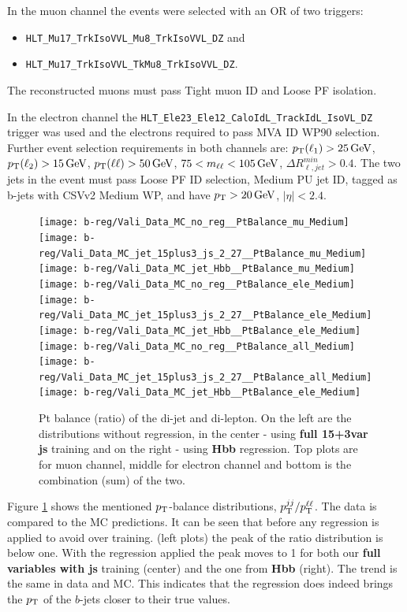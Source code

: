In the muon channel the events were selected with an OR of two triggers:
\begin{itemize}
\item \verb|HLT_Mu17_TrkIsoVVL_Mu8_TrkIsoVVL_DZ| and 
\item \verb|HLT_Mu17_TrkIsoVVL_TkMu8_TrkIsoVVL_DZ|. 
\end{itemize}
The reconstructed muons must pass Tight muon ID and Loose PF isolation. 

In the electron channel the \verb|HLT_Ele23_Ele12_CaloIdL_TrackIdL_IsoVL_DZ| trigger was used and
the electrons required to pass MVA ID WP90 selection.  
Further event selection requirements in both channels are: $p_{\mathrm{T}}(\ell_1) > 25\,\text{Ge\hspace{-.08em}V}$,
$p_{\mathrm{T}}(\ell_2) > 15\,\text{Ge\hspace{-.08em}V}$, $p_{\mathrm{T}}(\ell\ell) > 50\,\text{Ge\hspace{-.08em}V}$,
$75<m_{\ell\ell}<105\,\text{Ge\hspace{-.08em}V}$, $\Delta R^{min}_{\ell, jet} > 0.4$. The two
jets in the event must pass Loose PF ID selection, Medium PU jet ID,
tagged as b-jets with CSVv2 Medium WP, and have $p_{\mathrm{T}}>20\,\text{Ge\hspace{-.08em}V}$,
$|\eta|<2.4$.

\begin{figure}[thb]
  \centering
  \texttt{[image: b-reg/Vali\_Data\_MC\_no\_reg\_\_PtBalance\_mu\_Medium]}\hfil
  \texttt{[image: b-reg/Vali\_Data\_MC\_jet\_15plus3\_js\_2\_27\_\_PtBalance\_mu\_Medium]}\hfil
  \texttt{[image: b-reg/Vali\_Data\_MC\_jet\_Hbb\_\_PtBalance\_mu\_Medium]}\hfil\\
  \texttt{[image: b-reg/Vali\_Data\_MC\_no\_reg\_\_PtBalance\_ele\_Medium]}\hfil
  \texttt{[image: b-reg/Vali\_Data\_MC\_jet\_15plus3\_js\_2\_27\_\_PtBalance\_ele\_Medium]}\hfil
  \texttt{[image: b-reg/Vali\_Data\_MC\_jet\_Hbb\_\_PtBalance\_ele\_Medium]}\hfil\\
  \texttt{[image: b-reg/Vali\_Data\_MC\_no\_reg\_\_PtBalance\_all\_Medium]}\hfil
  \texttt{[image: b-reg/Vali\_Data\_MC\_jet\_15plus3\_js\_2\_27\_\_PtBalance\_all\_Medium]}\hfil
  \texttt{[image: b-reg/Vali\_Data\_MC\_jet\_Hbb\_\_PtBalance\_ele\_Medium]}\hfil\\
  \caption{Pt balance (ratio) of the di-jet and di-lepton. On the left
    are the distributions without regression, in the center - using
    \textbf{full 15+3var js} training and on the right - using
    \textbf{Hbb} regression.  Top plots are for muon channel, middle
    for electron channel and bottom is the combination (sum) of the
    two.}
  \label{fig:vali-pt}
\end{figure}

Figure \ref{fig:vali-pt} shows the mentioned $p_{\mathrm{T}}$-balance
distributions, $p_{\mathrm{T}}^{jj}/p_{\mathrm{T}}^{\ell\ell}$.  The data is compared to the
MC predictions. It can be seen that before any regression is applied to avoid over training.
(left plots) the peak of the ratio distribution is below one. With the
regression applied the peak moves to 1 for both our \textbf{full variables with js}
 training (center) and the one from \textbf{Hbb} (right). The
trend is the same in data and MC.  This indicates that the regression
does indeed brings the $p_{\mathrm{T}}$ of the $b$-jets closer to their true
values.

